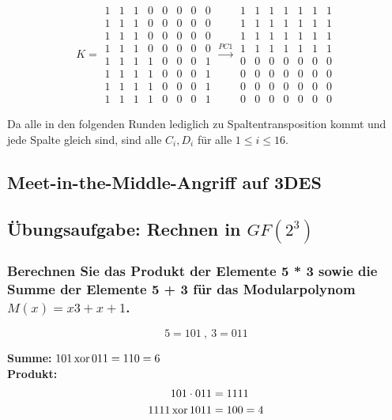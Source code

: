 \begin{equation}
K=\begin{matrix}
1 & 1 & 1 & 0 & 0 & 0 & 0 & 0 \\
1 & 1 & 1 & 0 & 0 & 0 & 0 & 0 \\
1 & 1 & 1 & 0 & 0 & 0 & 0 & 0 \\
1 & 1 & 1 & 0 & 0 & 0 & 0 & 0 \\
1 & 1 & 1 & 1 & 0 & 0 & 0 & 1 \\
1 & 1 & 1 & 1 & 0 & 0 & 0 & 1 \\
1 & 1 & 1 & 1 & 0 & 0 & 0 & 1 \\
1 & 1 & 1 & 1 & 0 & 0 & 0 & 1 
\end{matrix} \xrightarrow{PC1}
\begin{matrix}
1 & 1 & 1 & 1 & 1 & 1 & 1 \\
1 & 1 & 1 & 1 & 1 & 1 & 1 \\
1 & 1 & 1 & 1 & 1 & 1 & 1 \\ 
1 & 1 & 1 & 1 & 1 & 1 & 1 \\ 
0 & 0 & 0 & 0 & 0 & 0 & 0 \\ 
0 & 0 & 0 & 0 & 0 & 0 & 0 \\ 
0 & 0 & 0 & 0 & 0 & 0 & 0 \\ 
0 & 0 & 0 & 0 & 0 & 0 & 0 
\end{matrix}
\end{equation}

Da alle in den folgenden Runden lediglich zu Spaltentransposition kommt und jede Spalte gleich sind, 
sind alle $C_i,D_i$ für alle $1 \le i \le 16$.

\subsection{Meet-in-the-Middle-Angriff auf 3DES}

\subsection{Übungsaufgabe: Rechnen in $GF(2^3)$}
\subsubsection{Berechnen Sie das Produkt der Elemente {5} * {3} sowie die Summe der
Elemente {5} + {3} für das Modularpolynom $M(x)=x3+x+1$.}

\[ 5 = 101 ~,~ 3 = 011 \]

\textbf{Summe:}   	$101 \operatorname*{xor} 011 = 110 = 6$ \\
\textbf{Produkt:}   \begin{align}
						101 \cdot 011 &= 1111  \\
                       1111 \operatorname*{xor} 1011 &= 100 = 4
					\end{align} 
					
